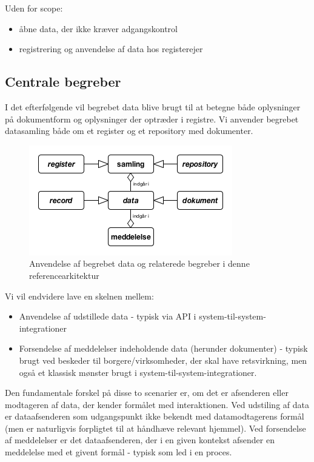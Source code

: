 Uden for scope:

\begin{itemize}
\tightlist
\item
  åbne data, der ikke kræver adgangskontrol
\item
  registrering og anvendelse af data hos registerejer
\end{itemize}

\subsection{Centrale begreber}\label{centrale-begreber}

I det efterfølgende vil begrebet data blive brugt til at betegne både
oplysninger på dokumentform og oplysninger der optræder i registre. Vi
anvender begrebet datasamling både om et register og et repository med
dokumenter.

\begin{figure}
\centering
\includegraphics[width=\textwidth]{figures/abstraktion.png}
\caption{Anvendelse af begrebet data og relaterede begreber i denne
referencearkitektur}
\end{figure}

Vi vil endvidere lave en skelnen mellem:

\begin{itemize}
\tightlist
\item
  Anvendelse af udstillede data - typisk via API i
  system-til-system-integrationer
\item
  Forsendelse af meddelelser indeholdende data (herunder dokumenter) -
  typisk brugt ved beskeder til borgere/virksomheder, der skal have
  retsvirkning, men også et klassisk mønster brugt i
  system-til-system-integrationer.
\end{itemize}

Den fundamentale forskel på disse to scenarier er, om det er afsenderen
eller modtageren af data, der kender formålet med interaktionen. Ved
udstiling af data er dataafsenderen som udgangspunkt ikke bekendt med
datamodtagerens formål (men er naturligvis forpligtet til at håndhæve
relevant hjemmel). Ved forsendelse af meddelelser er det dataafsenderen,
der i en given kontekst afsender en meddelelse med et givent formål -
typisk som led i en proces.


